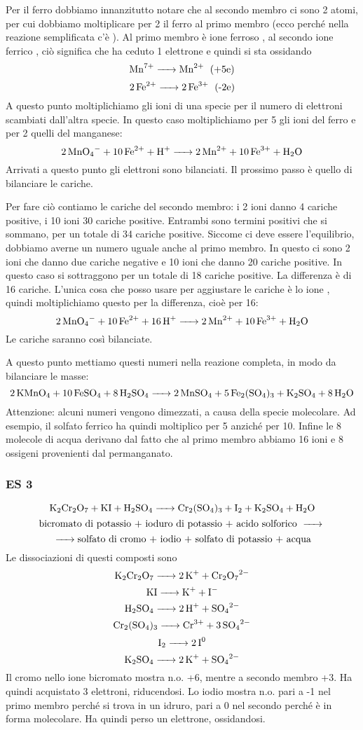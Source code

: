 Per il ferro dobbiamo innanzitutto notare che al secondo membro ci sono 2 atomi, per cui dobbiamo moltiplicare per 2 il ferro al primo membro (ecco perché nella reazione semplificata c'è ). Al primo membro è ione ferroso , al secondo ione ferrico , ciò significa che ha ceduto 1 elettrone e quindi si sta ossidando
$$\ce{Mn^7+ -> Mn^2+ \; \text{(+5e)}}$$
$$\ce{2Fe^2+ -> 2Fe^3+ \; \text{(-2e)}}$$
A questo punto moltiplichiamo gli ioni di una specie per il numero di elettroni scambiati dall'altra specie. In questo caso moltiplichiamo per 5 gli ioni del ferro e per 2 quelli del manganese:
$$\ce{2MnO_4- + 10Fe^2+ + H+ -> 2Mn^2+ + 10Fe^3+ + H_2O}$$
Arrivati a questo punto gli elettroni sono bilanciati. Il prossimo passo è quello di bilanciare le cariche.

Per fare ciò contiamo le cariche del secondo membro: i 2 ioni  danno 4 cariche positive, i 10 ioni  30 cariche positive. Entrambi sono termini positivi che si sommano, per un totale di 34 cariche positive. Siccome ci deve essere l'equilibrio, dobbiamo averne un numero uguale anche al primo membro. In questo ci sono 2 ioni  che danno due cariche negative e 10 ioni  che danno 20 cariche positive. In questo caso si sottraggono per un totale di 18 cariche positive. La differenza è di 16 cariche. L'unica cosa che posso usare per aggiustare le cariche è lo ione , quindi moltiplichiamo questo per la differenza, cioè per 16:
$$\ce{2MnO_4- + 10Fe^2+ + 16H+ -> 2Mn^2+ + 10Fe^3+ + H_2O}$$
Le cariche saranno così bilanciate.

A questo punto mettiamo questi numeri nella reazione completa, in modo da bilanciare le masse:
$$\ce{2KMnO_4 + 10FeSO_4 + 8H_2SO_4 -> 2MnSO_4 + 5Fe_2(SO_4)_3 + K_2SO_4 + 8H_2O}$$
Attenzione: alcuni numeri vengono dimezzati, a causa della specie molecolare. Ad esempio, il solfato ferrico ha  quindi moltiplico per 5 anziché per 10. Infine le 8 molecole di acqua derivano dal fatto che al primo membro abbiamo 16 ioni  e 8 ossigeni provenienti dal permanganato.\\
\subsubsection{\textbf{ES 3}}
$$\ce{K_2Cr_2O_7 + KI + H_2SO_4 -> Cr_2(SO_4)_3 + I_2 + K_2SO_4 + H_2O}$$
$$\text{bicromato di potassio + ioduro di potassio + acido solforico \ce{->}}$$
$${\ce{->} \text{solfato di cromo +  iodio + solfato di potassio + acqua}}$$
Le dissociazioni di questi composti sono
$$\ce{K_2Cr_2O_7 -> 2K^+ + Cr_2O_7^2-}$$ 
$$\ce{KI -> K+ + I-}$$
$$\ce{H_2SO_4 -> 2H+ + SO_4^2-}$$
$$\ce{Cr_2(SO_4)_3 -> Cr^3+ + 3SO_4^2-}$$
$$\ce{I_2 -> 2I^0}$$
$$\ce{K_2SO_4 -> 2K+ + SO_4^2-}$$
Il cromo nello ione bicromato mostra n.o. +6, mentre a secondo membro +3. Ha quindi acquistato 3 elettroni, riducendosi.
Lo iodio mostra n.o. pari a -1 nel primo membro perché si trova in un idruro, pari a 0 nel secondo perché è in forma molecolare. Ha quindi perso un elettrone, ossidandosi. 

